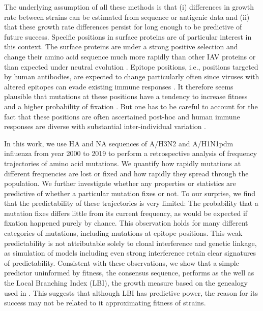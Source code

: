 \documentclass[reprint,amsmath,amssymb,superscriptaddress,showpacs,rmp]{revtex4-1}
\begin{document}
	The underlying assumption of all these methods is that (i) differences in growth rate between strains can be estimated from sequence or antigenic data and (ii) that these growth rate differences persist for long enough to be predictive of future success. 
	Specific positions in surface proteins are of particular interest in this context.
	The surface proteins are under a strong positive selection and change their amino acid sequence much more rapidly than other IAV proteins or than expected under neutral evolution \citep{bhatt_genomic_2011,strelkowa_clonal_2012}. 
	Epitope positions, i.e., positions targeted by human antibodies, are expected to change particularly often since viruses with altered epitopes can evade existing immune responses \citep{Koel976,wolf_long_2006,Shih6283}.
    It therefore seems plausible that mutations at these positions have a tendency to increase fitness and a higher probability of fixation \citep{strelkowa_clonal_2012}. 
    But one has to be careful to account for the fact that these positions are often ascertained post-hoc \citep{Shih6283} and human immune responses are diverse with substantial inter-individual variation
    \citep{lee_mapping_2019}.

	In this work, we use HA and NA sequences of A/H3N2 and A/H1N1pdm influenza from year 2000 to 2019 to perform a retrospective analysis of frequency trajectories of amino acid mutations. 
	We quantify how rapidly mutations at different frequencies are lost or fixed and how rapidly they spread through the population.
	We further investigate whether any properties or statistics are predictive of whether a particular mutation fixes or not. 
	To our surprise, we find that the predictability of these trajectories is very limited: The probability that a mutation fixes differs little from its current frequency, as would be expected if fixation happened purely by chance.
	This observation holds for many different categories of mutations, including mutations at epitope positions. 
	This weak predictability is not attributable solely to clonal interference and genetic linkage, as simulation of models including even strong interference retain clear signatures of predictability. 
	Consistent with these observations, we show that a simple predictor uninformed by fitness, the consensus sequence, performs as the well as the Local Branching Index (LBI), the growth measure based on the genealogy used in \cite{neher_predicting_2014}. 
	This suggests that although LBI has predictive power, the reason for its success may not be related to it approximating fitness of strains.  
\end{document}
